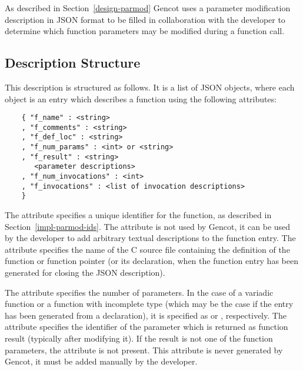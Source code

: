 As described in Section~\ref{design-parmod} Gencot uses a parameter modification description in JSON format 
to be filled in collaboration with the developer to determine which function parameters may be modified during
a function call. 

\subsection{Description Structure}
\label{impl-parmod-struct}

This
description is structured as follows. It is a list of JSON objects, where each object is an entry which describes a function using
the following attributes:
\begin{verbatim}
    { "f_name" : <string>
    , "f_comments" : <string>
    , "f_def_loc" : <string>
    , "f_num_params" : <int> or <string>
    , "f_result" : <string>
       <parameter descriptions>
    , "f_num_invocations" : <int>
    , "f_invocations" : <list of invocation descriptions>
    }
\end{verbatim}

The attribute  specifies a unique identifier for the function, as described in Section~\ref{impl-parmod-ids}.
The attribute  is not used by Gencot, it can be used by the developer to add arbitrary textual
descriptions to the function entry. The attribute  specifies the name of the C source file containing
the definition of the function or function pointer (or its declaration, when the function entry has been 
generated for closing the JSON description). 

The attribute  specifies the number of parameters. In the case of a variadic function or a function
with incomplete type (which may be the case if the entry has been generated from a declaration), it is specified
as  or , respectively. The attribute  specifies the identifier of
the parameter which is returned as function result (typically after modifying it). If the result is not one of the 
function parameters, the attribute is not present. This attribute is never generated by Gencot, it must be added manually
by the developer. 

